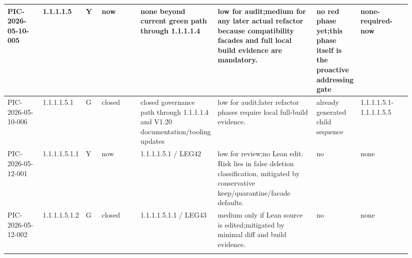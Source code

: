 \begin{longtable}{L{0.095\linewidth} L{0.055\linewidth} L{0.04\linewidth} L{0.105\linewidth} L{0.19\linewidth} L{0.25\linewidth} L{0.07\linewidth} L{0.135\linewidth}}
\hline
\addlinespace[0.24em]
PIC-2026-05-10-005 & 1.1.1.1.5 & Y & now & none beyond current green path through 1.1.1.1.4 & low for audit;\newline medium for any later actual refactor because compatibility facades and full local build evidence are mandatory. & no red phase yet;\newline this phase itself is the proactive addressing gate & none-required-now\\
\hline
\addlinespace[0.24em]
PIC-2026-05-10-006 & 1.1.1.1.5.1 & G & closed & closed governance path through 1.1.1.1.4 and V1.20 documentation/\allowbreak{}tooling updates & low for audit;\newline later refactor phases require local full-build evidence. & already generated child sequence & 1.1.1.1.5.1-1.1.1.1.5.5\\
\hline
\addlinespace[0.24em]
PIC-2026-05-12-001 & 1.1.1.1.5.1.1 & Y & now & 1.1.1.1.5.1 /\allowbreak{} LEG42 & low for review;\newline no Lean edit. Risk lies in false deletion classification, mitigated by conservative keep/\allowbreak{}quarantine/\allowbreak{}facade defaults. & no & none\\
\hline
\addlinespace[0.24em]
PIC-2026-05-12-002 & 1.1.1.1.5.1.2 & G & closed & 1.1.1.1.5.1.1 /\allowbreak{} LEG43 & medium only if Lean source is edited;\newline mitigated by minimal diff and build evidence. & no & none\\
\hline
\addlinespace[0.24em]
\end{longtable}
\normalsize
